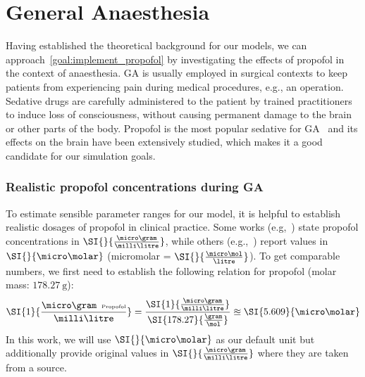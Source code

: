 \section{General Anaesthesia}\label{sec:general-anaesthesia}
Having established the theoretical background for our models,
we can approach~\ref{goal:implement_propofol} by investigating the effects of propofol in the context of anaesthesia.
GA is usually employed in surgical contexts to keep patients from experiencing pain during medical
procedures, e.g., an operation.
Sedative drugs are carefully administered to the patient by trained practitioners to induce loss of consciousness,
without causing permanent damage to the brain or other parts of the body.
Propofol is the most popular sedative for GA~\cite{miner_clinical_2007, sahinovic_clinical_2018}
and its effects on the brain have been extensively studied,
which makes it a good candidate for our simulation goals.

\subsubsection{Realistic propofol concentrations during GA}\label{subsubsec:realistic-prop-conc-during-ga}
To estimate sensible parameter ranges for our model,
it is helpful to establish realistic dosages of propofol in clinical practice.
Some works (e.g,~\cite{iwakiri_individual_2005, ferreira_patterns_2020}) state propofol concentrations in $\SI{}{\frac{\micro\gram}{\milli\litre}}$,
while others (e.g.,~\cite{kitamura_effects_2003, mcdougall_propofol_2008}) report values in $\SI{}{\micro\molar}$ (micromolar =
$\SI{}{\frac{\micro\mol}{\litre}}$).
To get comparable numbers, we first need to establish the following relation for propofol
(molar mass: $\SI{178.27}{\gram}$):
\[ \SI{1}{\frac{\micro\gram\hspace{0.5em}\text{\tiny{Propofol}}}{\milli\litre}}  =
\frac{ \SI{1}{\frac{\micro\gram}{\milli\litre}}}{\SI{178.27}{\frac{\gram}{\mol}}} \approxeq \SI{5.609}{\micro\molar} \]
In this work, we will use $\SI{}{\micro\molar}$ as our default unit
but additionally provide original values in $\SI{}{\frac{\micro\gram}{\milli\litre}}$ where they are taken from a source.

